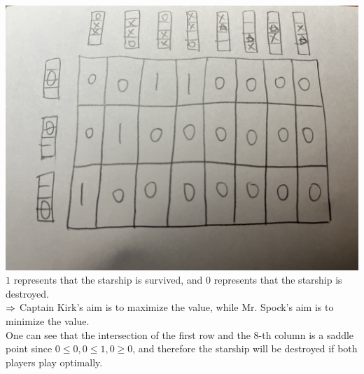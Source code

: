 \begin{pr}[7.11.32]$ $\\
\includegraphics[width=15cm]{p3.JPG}\\
$1$ represents that the starship is survived, and $0$ represents that the starship is destroyed.\\
$\Rightarrow$ Captain Kirk's aim is to maximize the value, while Mr. Spock's aim is to minimize the value.\\
One can see that the intersection of the first row and the $8$-th column is a saddle point since $0\leq0, 0\leq1, 0\geq0$, and therefore the starship will be destroyed if both players play optimally.
\end{pr}

